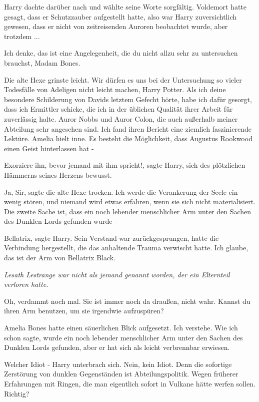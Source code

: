 Harry dachte darüber nach und wählte seine Worte sorgfältig. Voldemort hatte
gesagt, dass er Schutzzauber aufgestellt hatte, also war Harry zuversichtlich
gewesen, dass er nicht von zeitreisenden Auroren beobachtet wurde, aber
trotzdem ...

\glqq{}Ich denke, das ist eine Angelegenheit, die du nicht allzu sehr zu
untersuchen brauchst, Madam Bones.\grqq{}

Die alte Hexe grinste leicht. \glqq{}Wir dürfen es uns bei der Untersuchung so
vieler Todesfälle von Adeligen nicht leicht machen, Harry Potter. Als ich deine
besondere Schilderung von Davids letztem Gefecht hörte, habe ich dafür gesorgt,
dass ich Ermittler schicke, die ich in der üblichen Qualität ihrer Arbeit für
zuverlässig halte. Auror Nobbs und Auror Colon, die auch außerhalb meiner
Abteilung sehr angesehen sind. Ich fand ihren Bericht eine ziemlich
faszinierende Lektüre.\grqq{} Amelia hielt inne. \glqq{}Es besteht die Möglichkeit,
dass Augustus Rookwood einen Geist hinterlassen hat -\grqq{}

\glqq{}Exorziere ihn, bevor jemand mit ihm spricht!\grqq{}, sagte Harry, sich des
plötzlichen Hämmerns seines Herzens bewusst.

\glqq{}Ja, Sir\grqq{}, sagte die alte Hexe trocken. \glqq{}Ich werde die
Verankerung der Seele ein wenig stören, und niemand wird etwas erfahren, wenn
sie sich nicht materialisiert. Die zweite Sache ist, dass ein noch lebender
menschlicher Arm unter den Sachen des Dunklen Lords gefunden wurde -\grqq{}

\glqq{}Bellatrix\grqq{}, sagte Harry. Sein Verstand war zurückgesprungen, hatte
die Verbindung hergestellt, die das anhaltende Trauma verwischt hatte. \glqq{}Ich
glaube, das ist der Arm von Bellatrix Black.\grqq{}

\emph{Lesath Lestrange war nicht als jemand genannt worden, der ein Elternteil
verloren hatte.}

\glqq{}Oh, verdammt noch mal. Sie ist immer noch da draußen, nicht wahr. Kannst
du ihren Arm benutzen, um sie irgendwie aufzuspüren?\grqq{}

Amelia Bones hatte einen säuerlichen Blick aufgesetzt. \glqq{}Ich verstehe. Wie
ich schon sagte, wurde ein noch lebender menschlicher Arm unter den Sachen des
Dunklen Lords gefunden, aber er hat sich als leicht verbrennbar erwiesen.\grqq{}

\glqq{}Welcher Idiot -\grqq{} Harry unterbrach sich. \glqq{}Nein, kein Idiot. Denn die
sofortige Zerstörung von dunklen Gegenständen ist Abteilungspolitik. Wegen
früherer Erfahrungen mit Ringen, die man eigentlich sofort in Vulkane hätte
werfen sollen. Richtig?\grqq{}

